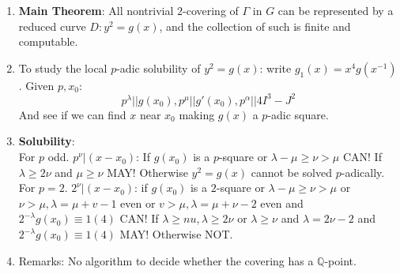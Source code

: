 \documentclass{article}
\newcommand{\Q}{\mathbb{Q}}
\begin{document}
\begin{multicols}{2}
\begin{enumerate}
\item \textbf{Main Theorem}: All nontrivial $2$-covering of $\Gamma$ in $G$ can be represented by a reduced curve $D: y^2 = g(x)$, and the collection of such is finite and computable. 

\item To study the local $p$-adic solubility of $y^2 = g(x)$: write $g_1(x) = x^4g(x^{-1})$. Given $p, x_0$:
\[p^\lambda||g(x_0), p^\mu||g'(x_0), p^\alpha||4I^3 - J^2\]
And see if we can find $x$ near $x_0$ making $g(x)$ a $p$-adic square. 

\item \textbf{Solubility}: \\
For $p$ odd. $p^\nu|(x-x_0)$: If $g(x_0)$ is a $p$-square or $\lambda - \mu \geq \nu > \mu$ CAN! If $\lambda \geq 2 \nu$ and $\mu \geq \nu$ MAY! Otherwise $y^2 = g(x)$ cannot be solved $p$-adically.\\
For $p = 2$. $2^\nu|(x-x_0)$: if $g(x_0)$ is a $2$-square or $\lambda - \mu \geq \nu > \mu$ or $\nu > \mu, \lambda = \mu + v - 1$ even or $v > \mu, \lambda = \mu + \nu - 2$ even and $2^{-\lambda} g(x_0) \equiv 1(4)$ CAN! If $\lambda \geq nu, \lambda \geq 2\nu$ or $\lambda \geq \nu$ and $\lambda = 2\nu - 2$ and $2^{-\lambda}g(x_0) \equiv 1(4)$ MAY! Otherwise NOT. 

\item Remarks: No algorithm to decide whether the covering has a $\Q$-point. 
\end{enumerate}
\end{multicols}
\end{document}
